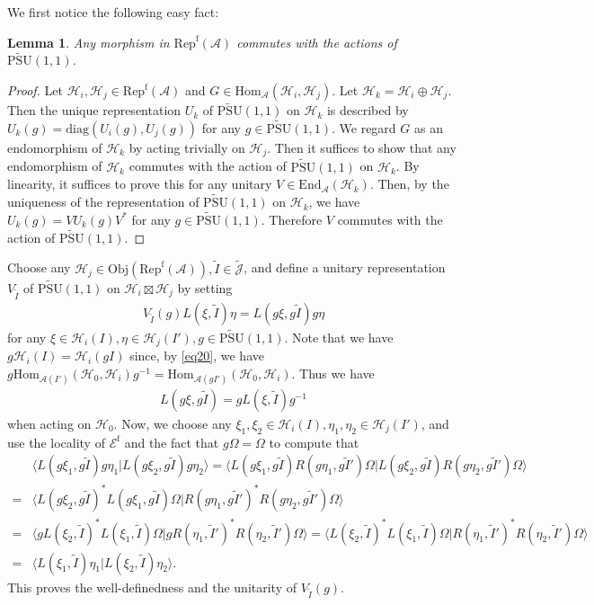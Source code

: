 \documentclass[12pt,a4paper]{article}
\theoremstyle{definition}
\theoremstyle{plain}
\newtheorem{lm}[df]{Lemma}
\newcommand{\mc}{\mathcal}
\newcommand{\wtd}{\widetilde}
\newcommand{\End}{\mathrm{End}} %
\newcommand{\Hom}{\mathrm{Hom}}
\newcommand{\diag}{\mathrm{diag}}
\newcommand{\UPSU}{\widetilde{\mathrm{PSU}}(1,1)}
\newcommand{\bk}[1]{\langle {#1}\rangle}
\newcommand{\Jtd}{\widetilde{\mathcal J}}
\newcommand{\RepfA}{\mathrm{Rep}^{\mathrm f}(\mc A)}
\newcommand{\Obj}{\mathrm{Obj}}
\newcommand{\Ef}{\mathscr E^{\mathrm f}}
\numberwithin{equation}{section}
\begin{document}
We first notice the following easy fact:

\begin{lm}\label{lb21}
Any morphism in $\RepfA$ commutes with the actions of $\UPSU$.
\end{lm}
\begin{proof}
Let $\mc H_i,\mc H_j\in\RepfA$ and $G\in\Hom_{\mc A}(\mc H_i,\mc H_j)$. Let $\mc H_k=\mc H_i\oplus\mc H_j$. Then the unique representation $U_k$ of $\UPSU$ on $\mc H_k$ is described by $U_k(g)=\diag(U_i(g),U_j(g))$ for any $g\in\UPSU$. We regard $G$ as an endomorphism of $\mc H_k$ by acting trivially on $\mc H_j$. Then it suffices to show that any endomorphism of $\mc H_k$ commutes with the action of $\UPSU$ on $\mc H_k$. By linearity, it suffices to prove this for any unitary $V\in\End_{\mc A}(\mc H_k)$. Then, by the uniqueness of the representation of $\UPSU$ on $\mc H_k$, we have $U_k(g)=VU_k(g)V^*$ for any $g\in\UPSU$. Therefore $V$ commutes with the action of $\UPSU$. 
\end{proof}

Choose any $\mc H_j\in\Obj(\RepfA),\wtd I\in\Jtd$, and define a unitary representation $V_{\wtd I}$ of $\UPSU$ on $\mc H_i\boxtimes\mc H_j$ by setting
\begin{align}
V_{\wtd I}(g)L(\xi,\wtd I)\eta=L(g\xi,g\wtd I)g\eta\label{eq54}
\end{align}  
for any $\xi\in\mc H_i(I),\eta\in\mc H_j(I'),g\in\UPSU$. Note that we have $g\mc H_i(I)=\mc H_i(gI)$ since, by \eqref{eq20}, we have $g\Hom_{\mc A(I')}(\mc H_0,\mc H_i)g^{-1}=\Hom_{\mc A(gI')}(\mc H_0,\mc H_i)$. Thus we have
\begin{align*}
L(g\xi,g\wtd I)=gL(\xi,\wtd I)g^{-1}
\end{align*}
when acting on $\mc H_0$. Now,   we choose any $\xi_1,\xi_2\in\mc H_i(I),\eta_1,\eta_2\in \mc H_j(I')$, and use the locality of $\Ef$ and the fact that $g\Omega=\Omega$ to compute that
\begin{align}
&\bk{L(g\xi_1,g\wtd I)g\eta_1|L(g\xi_2,g\wtd I)g\eta_2}=\bk{L(g\xi_1,g\wtd I)R(g\eta_1,g\wtd I')\Omega|L(g\xi_2,g\wtd I)R(g\eta_2,g\wtd I')\Omega}\nonumber\\
=&\bk{L(g\xi_2,g\wtd I)^*L(g\xi_1,g\wtd I)\Omega|R(g\eta_1,g\wtd I')^*R(g\eta_2,g\wtd I')\Omega}\nonumber\\
=&\bk{gL(\xi_2,\wtd I)^*L(\xi_1,\wtd I)\Omega|gR(\eta_1,\wtd I')^*R(\eta_2,\wtd I')\Omega}=\bk{L(\xi_2,\wtd I)^*L(\xi_1,\wtd I)\Omega|R(\eta_1,\wtd I')^*R(\eta_2,\wtd I')\Omega}\nonumber\\
=&\bk{L(\xi_1,\wtd I)\eta_1|L(\xi_2,\wtd I)\eta_2}.\label{eq56}
\end{align}
This proves the well-definedness and the unitarity of $V_{\wtd I}(g)$.
\end{document}
